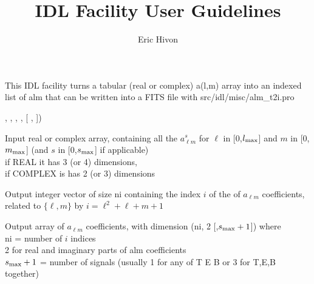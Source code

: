 

\sloppy

\title{\healpix IDL Facility User Guidelines}
 \section[alm\_t2i]{ }
\label{idl:alm_t2i}
\author{Eric Hivon}

\begin{facility}
{This IDL facility turns a tabular (real or complex) a(l,m) array into an
indexed list of alm that can be written into a FITS file with %
}
{src/idl/misc/alm\_t2i.pro}
\end{facility}

\begin{IDLformat}
{\thedocid, %
,
, 
,
[%
,
%
])}
\end{IDLformat}

\begin{qualifiers}
  \begin{qulist}{} %
    \item[Alm\_table] 
Input real or complex array, containing all the $a^s_{\ell m}$ for $\ell$
         in [0,$l_{\mathrm{max}}$] and $m$ in [0,$m_{\mathrm{max}}$] 
(and $s$ in [0,$s_{\mathrm{max}}$] if applicable)\\
       if REAL    it has 3 (or 4) dimensions,\\
       if COMPLEX is has 2 (or 3) dimensions

    \item[Index] 
Output integer vector of size ni containing the index $i$ of the 
            of $a_{\ell m}$ coefficients, related to $\{\ell,m\}$ by 
             $i = \ell^2 + \ell + m + 1$
    \item[Alm\_vec] %
Output array of $a_{\ell m}$ coefficients, with dimension (ni, 2 [,$s_{\mathrm{max}}+1$])
     where\\
           ni   = number of $i$ indices\\
           2 for real and imaginary parts of alm coefficients\\
           $s_{\mathrm{max}}+1$ = number of signals (usually 1 for any of T E B
                  or 3 for T,E,B together)
\end{qulist}
\end{qualifiers}

